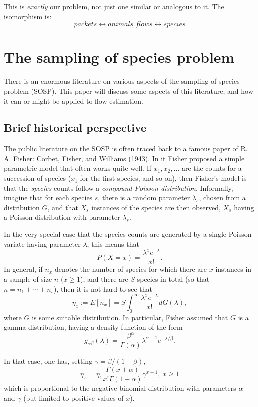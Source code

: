 \documentclass{paper}
\begin{document}
This is \emph{exactly} our problem, not just one similar or analogous to it.
The isomorphism is:
$$ packets \longleftrightarrow animals \; flows \longleftrightarrow species $$

\section{The sampling of species problem}

There is an enormous literature on various aspects of the sampling of species
problem (SOSP). This paper will discuss some aspects of this literature, and
how it can or might be applied to flow estimation.

\subsection{Brief historical perspective}

The public literature on the SOSP is often traced back to a famous paper of R.
A. Fisher: Corbet, Fisher, and Williams (1943). In it Fisher proposed a
simple parametric model that often works quite well. If $x_1, x_2, \dots$ are
the counts for a succession of species ($x_1$ for the first species, and so
on), then Fisher's model is that the \emph{species} counts follow a
\emph{compound Poisson distribution}. Informally, imagine that for each species
$s$, there is a random parameter $\lambda_s$, chosen from a distribution $G$, and
that $X_s$ instances of the species are then observed, $X_s$ having a Poisson
distribution with parameter $\lambda_s$.

In the very special case that the species counts are generated by a single
Poisson variate having parameter $\lambda$, this means that
$$ P(X = x) = \frac{\lambda^x e^{-\lambda}}{x!}. $$
In general, if $n_x$ denotes the number of species for which there are $x$
instances in a sample of size $n$ ($x \geq 1$), and there are $S$ species in
total (so that $n = n_1 + \cdots + n_s$), then it is not hard to see that
$$ \eta_x := E[n_x] = S \int_0^\infty \frac{\lambda^x e^{-\lambda}}{x!} dG(\lambda), $$
where $G$ is some suitable distribution. In particular, Fisher assumed that $G$
is a gamma distribution, having a density function of the form
$$ g_{\alpha\beta}(\lambda) = \frac{\beta^\alpha}{\Gamma(\alpha)} \lambda^{\alpha-1}e^{-\lambda/\beta}. $$

In that case, one has, setting $\gamma = \beta/(1+\beta)$,
$$ \eta_x = \eta_1 \frac{\Gamma(x + \alpha)}{x!\Gamma(1+\alpha)}\gamma^{x-1},~x \geq 1 $$
which is proportional to the negative binomial distribution with parameters
$\alpha$ and $\gamma$ (but limited to positive values of $x$).
\end{document}

